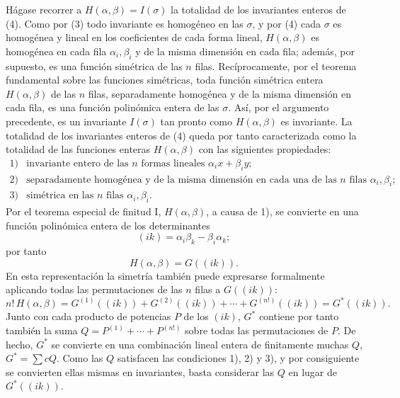 Hágase recorrer a \(H(\alpha,\beta)=I(\sigma)\) la totalidad de los invariantes enteros de (4). Como por (3) todo invariante es homogéneo en las \(\sigma\), y por (4) cada \(\sigma\) es homogénea y lineal en los coeficientes de cada forma lineal, \(H(\alpha,\beta)\) es homogénea en cada fila \(\alpha_i,\beta_i\) y de la misma dimensión en cada fila; además, por supuesto, es una función simétrica de las \(n\) filas. Recíprocamente, por el teorema fundamental sobre las funciones simétricas, toda función simétrica entera \(H(\alpha,\beta)\) de las \(n\) filas, separadamente homogénea y de la misma dimensión en cada fila, es una función polinómica entera de las \(\sigma\). Así, por el argumento precedente, es un invariante \(I(\sigma)\) tan pronto como \(H(\alpha,\beta)\) es invariante. La totalidad de los invariantes enteros de (4) queda por tanto caracterizada como la totalidad de las funciones enteras \(H(\alpha,\beta)\) con las siguientes propiedades:
\[
\begin{array}{ll}
1) & \text{invariante entero de las \(n\) formas lineales \(\alpha_i x+\beta_i y\);}\\
2) & \text{separadamente homogénea y de la misma dimensión en cada una de las \(n\) filas \(\alpha_i,\beta_i\);}\\
3) & \text{simétrica en las \(n\) filas \(\alpha_i,\beta_i\).}
\end{array}
\]
Por el teorema especial de finitud I, \(H(\alpha,\beta)\), a causa de 1), se convierte en una función polinómica entera de los determinantes
\[
        (ik)=\alpha_i\beta_k-\beta_i\alpha_k;
\]
por tanto
\[
        H(\alpha,\beta)=G((ik)).
\]
En esta representación la simetría también puede expresarse formalmente aplicando todas las permutaciones de las \(n\) filas a \(G((ik))\):
\begin{equation}
        n!\,H(\alpha,\beta)
        =
        G^{(1)}((ik))+G^{(2)}((ik))+\cdots+G^{(n!)}((ik))
        =G^*((ik)).
\end{equation}
Junto con cada producto de potencias \(P\) de los \((ik)\), \(G^*\) contiene por tanto también la suma \(Q=P^{(1)}+\cdots+P^{(n!)}\) sobre todas las permutaciones de \(P\). De hecho, \(G^*\) se convierte en una combinación lineal entera de finitamente muchas \(Q\), \(G^*=\sum cQ\). Como las \(Q\) satisfacen las condiciones 1), 2) y 3), y por consiguiente se convierten ellas mismas en invariantes, basta considerar las \(Q\) en lugar de \(G^*((ik))\).

